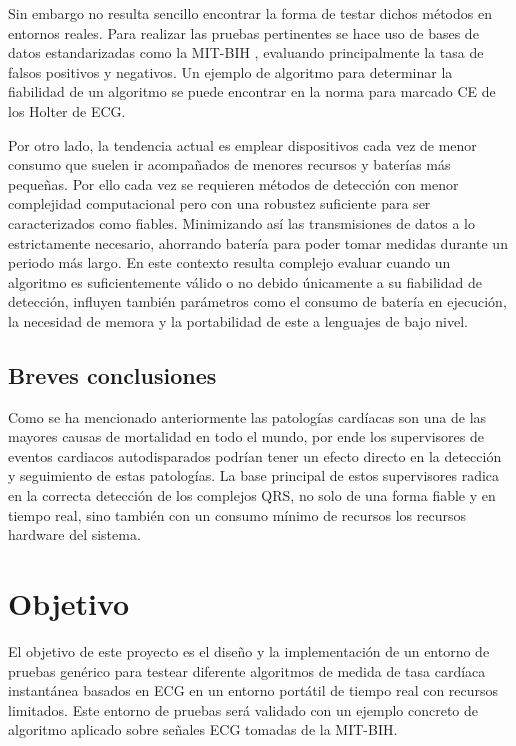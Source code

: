 Sin embargo no resulta sencillo encontrar la forma de testar dichos métodos en entornos reales. Para realizar las pruebas pertinentes se hace uso de bases de datos estandarizadas como la MIT-BIH \cite{MIT-BIH}, evaluando principalmente la tasa de falsos positivos y negativos.\cite{Pooja} Un ejemplo de algoritmo para determinar la fiabilidad de un algoritmo se puede encontrar en la norma para marcado CE de los Holter de ECG. \cite{Aenor2002}

Por otro lado, la tendencia actual es emplear dispositivos cada vez de menor consumo que suelen ir acompañados de menores recursos y baterías más pequeñas. Por ello cada vez se requieren métodos de detección con menor complejidad computacional pero con una robustez suficiente para ser caracterizados como fiables. Minimizando así las transmisiones de datos a lo estrictamente necesario, ahorrando batería para poder tomar medidas durante un periodo más largo. En este contexto resulta complejo evaluar cuando un algoritmo es suficientemente válido o no debido únicamente a su fiabilidad de detección, influyen también parámetros como el consumo de batería en ejecución, la necesidad de memora y la portabilidad de este a lenguajes de bajo nivel.

\subsection{Breves conclusiones}

Como se ha mencionado anteriormente las patologías cardíacas son una de las mayores causas de mortalidad en todo el mundo, por ende los supervisores de eventos cardiacos autodisparados podrían tener un efecto directo en la detección y seguimiento de estas patologías. La base principal de estos supervisores radica en la correcta detección de los complejos QRS, no solo de una forma fiable y en tiempo real, sino también con un consumo mínimo de recursos los recursos hardware del sistema.

\section{Objetivo}
El objetivo de este proyecto es el diseño y la implementación de un entorno de pruebas genérico para testear diferente algoritmos de medida de tasa cardíaca instantánea basados en ECG en un entorno portátil de tiempo real con recursos limitados. Este entorno de pruebas será validado con un ejemplo concreto de algoritmo aplicado sobre señales ECG tomadas de la MIT-BIH.

